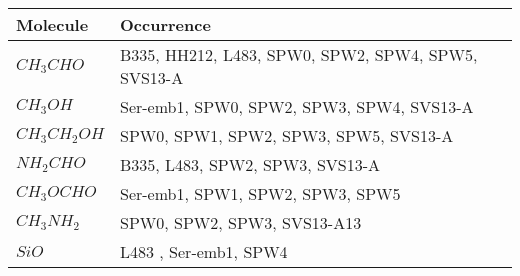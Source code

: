 \documentclass[10pt]{article}
\begin{document}
\begin{tabular}{p{2cm} p{8cm}}
\hline
Molecule & Occurrence \\
\hline
\hline
$CH_{3}CHO$ & B335, HH212, L483, SPW0, SPW2, SPW4, SPW5, SVS13-A \\
$CH_{3}OH$ & Ser-emb1, SPW0, SPW2, SPW3, SPW4, SVS13-A \\
$CH_{3}CH_{2}OH$ & SPW0, SPW1, SPW2, SPW3, SPW5, SVS13-A \\
$NH_{2}CHO$ &  B335, L483, SPW2, SPW3, SVS13-A \\
$CH_{3}OCHO$ &  Ser-emb1, SPW1, SPW2, SPW3, SPW5 \\
$CH_{3}NH_{2}$ &  SPW0, SPW2, SPW3, SVS13-A13 \\
$SiO$ &  L483 , Ser-emb1, SPW4 \\
\hline
\end{tabular}
\end{document}
